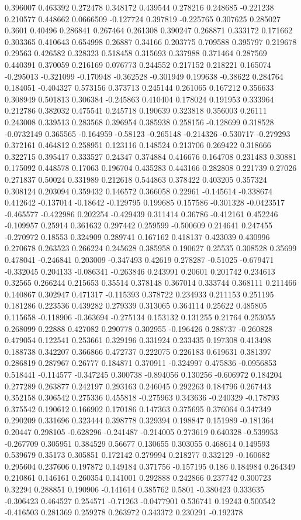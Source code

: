 0.396007 0.463392 0.272478 0.348172 0.439544 0.278216 0.248685 -0.221238 0.210577 0.448662 0.0666509 -0.127724 0.397819 -0.225765 0.307625 0.285027 0.3601 0.40496 0.286841 0.267464 0.261308 0.390247 0.268871 0.333172 0.171662 0.303365 0.410643 0.654998 0.26887 0.34166 0.203775 0.709588 0.395797 0.219678 0.29563 0.426582 0.328323 0.518458 0.315693 0.337988 0.371464 0.287569 0.440391 0.370059 0.216169 0.076773 0.244552 0.217152 0.218221 0.165074 -0.295013 -0.321099 -0.170948 -0.362528 -0.301949 0.199638 -0.38622 0.284764 0.184051 -0.404327 0.573156 0.373713 0.245144 0.261065 0.167212 0.356633 0.308949 0.501813 0.306384 -0.245863 0.410404 0.178024 0.191953 0.333964 0.212786 0.382032 0.475541 0.245718 0.190639 0.323818 0.356003 0.26111 0.243008 0.339513 0.283568 0.396954 0.385938 0.258156 -0.128699 0.318528 -0.0732149 0.365565 -0.164959 -0.58123 -0.265148 -0.214326 -0.530717 -0.279293 0.372161 0.464812 0.258951 0.123116 0.148524 0.213706 0.269422 0.318666 0.322715 0.395417 0.333527 0.24347 0.374884 0.416676 0.164708 0.231483 0.30881 0.175092 0.448578 0.17063 0.196704 0.435283 0.443166 0.282808 0.221739 0.27026 0.271837 0.50024 0.331989 0.212618 0.544863 0.378422 0.403205 0.357324 0.308124 0.203094 0.359432 0.146572 0.366058 0.22961 -0.145614 -0.338674 0.412642 -0.137014 -0.18642 -0.129795 0.199685 0.157586 -0.301328 -0.0423517 -0.465577 -0.422986 0.202254 -0.429439 0.311414 0.36786 -0.412161 0.452246 -0.109957 0.25914 0.361632 0.297442 0.259599 -0.500609 0.214641 0.247455 -0.270972 0.18553 0.324909 0.289741 0.167162 0.418137 0.423039 0.430996 0.270678 0.263523 0.266224 0.245628 0.385958 0.190627 0.25535 0.308528 0.35699 0.478041 -0.246841 0.203009 -0.347493 0.42619 0.278287 -0.51025 -0.679471 -0.332045 0.204133 -0.086341 -0.263846 0.243991 0.20601 0.201742 0.234613 0.32565 0.266244 0.215653 0.35514 0.378148 0.367014 0.333744 0.368111 0.211466 0.140867 0.302947 0.471317 -0.115393 0.378722 0.234933 0.211153 0.251195 0.181286 0.223536 0.439282 0.279339 0.313065 0.364114 0.25622 0.485805 0.115658 -0.118906 -0.363694 -0.275134 0.153132 0.131255 0.21764 0.253055 0.268099 0.22888 0.427082 0.290778 0.302955 -0.196426 0.288737 -0.260828 0.479054 0.122541 0.253661 0.329196 0.331924 0.233435 0.197308 0.413498 0.188738 0.342207 0.366866 0.472737 0.222075 0.226183 0.619631 0.381397 0.286819 0.287967 0.26777 0.184871 0.370911 -0.324997 0.475836 -0.0956853 0.518441 -0.114577 -0.347245 0.300738 -0.894056 0.130256 -0.606972 0.184204 0.277289 0.263877 0.242197 0.293163 0.246045 0.292263 0.184796 0.267443 0.352158 0.306542 0.275336 0.455818 -0.275963 0.343636 -0.240329 -0.178793 0.375542 0.190612 0.166902 0.170186 0.147363 0.375695 0.376064 0.347349 0.290209 0.331696 0.323444 0.398778 0.329394 0.198847 0.151989 -0.181364 0.20447 0.298105 -0.628296 -0.241487 -0.214005 0.273619 0.640328 -0.539953 -0.267709 0.305951 0.384529 0.56677 0.130655 0.303055 0.468614 0.149593 0.539679 0.35173 0.305851 0.172142 0.279994 0.218277 0.332129 -0.160682 0.295604 0.237606 0.197872 0.149184 0.371756 -0.157195 0.186 0.184984 0.264349 0.210861 0.146161 0.260354 0.141001 0.292888 0.242866 0.237742 0.300723 0.32294 0.288851 0.190906 -0.141614 0.385762 0.5801 -0.380423 0.333635 -0.306423 0.464527 0.254571 -0.71263 -0.0477901 0.536741 0.19243 0.500542 -0.416503 0.281369 0.259278 0.263972 0.343372 0.230291 -0.192378 